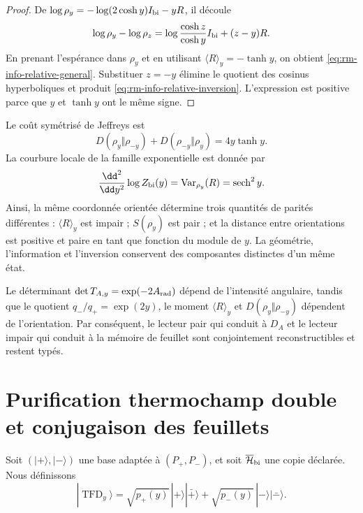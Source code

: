 \begin{proof}
De \(\log\rho_y=-\log(2\cosh y)I_{\rm bi}-yR\), il découle
\[
 \log\rho_y-\log\rho_z
 =\log\frac{\cosh z}{\cosh y}I_{\rm bi}+(z-y)R.
\]
En prenant l'espérance dans \(\rho_y\) et en utilisant
\(\langle R\rangle_y=-\tanh y\), on obtient
\cref{eq:rm-info-relative-general}. Substituer \(z=-y\) élimine le quotient
des cosinus hyperboliques et produit
\cref{eq:rm-info-relative-inversion}. L'expression est positive parce que
\(y\) et \(\tanh y\) ont le même signe.
\end{proof}

Le coût symétrisé de Jeffreys est
\begin{equation}
 D(\rho_y\Vert\rho_{-y})
 +D(\rho_{-y}\Vert\rho_y)
 =4y\tanh y.
 \label{eq:rm-info-jeffreys}
\end{equation}
La courbure locale de la famille exponentielle est donnée par
\begin{equation}
 \frac{\dd^2}{\dd y^2}\log Z_{\rm bi}(y)
 =\operatorname{Var}_{\rho_y}(R)
 =\operatorname{sech}^2y.
 \label{eq:rm-info-fisher}
\end{equation}
Ainsi, la même coordonnée orientée détermine trois quantités de parités
différentes : \(\langle R\rangle_y\) est impair ; \(S(\rho_y)\) est pair ; et la
distance entre orientations est positive et paire en tant que fonction du module
de \(y\). La géométrie, l'information et l'inversion conservent
des composantes distinctes d'un même état.

\begin{corollary}
Le déterminant
\(\det T_{A,y}=\exp(-2A_{\rm rad})\) dépend de l'intensité angulaire,
tandis que le quotient \(q_-/q_+=\exp(2y)\), le moment
\(\langle R\rangle_y\) et
\(D(\rho_y\Vert\rho_{-y})\) dépendent de l'orientation. Par conséquent, le
lecteur pair qui conduit à \(D_A\) et le lecteur impair qui conduit à la mémoire
de feuillet sont conjointement reconstructibles et restent typés.
\end{corollary}

\section{Purification thermochamp double et conjugaison des feuillets}

Soit \((|+\rangle,|-\rangle)\) une base adaptée à
\((P_+,P_-)\), et soit \(\overline{\mathcal H}_{\rm bi}\) une copie
déclarée. Nous définissons
\begin{equation}
 |\operatorname{TFD}_y\rangle
 =\sqrt{p_+(y)}\,|+\rangle|\bar +\rangle
 +\sqrt{p_-(y)}\,|-\rangle|\bar -\rangle.
 \label{eq:rm-info-tfd-bicapa}
\end{equation}


